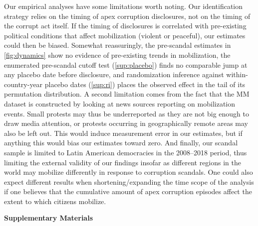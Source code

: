 \documentclass[11pt]{article}
\begin{document}
Our empirical analyses have some limitations worth noting. Our identification strategy relies on the timing of apex corruption disclosures, not on the timing of the corrupt act itself. If the timing of disclosures is correlated with pre-existing political conditions that affect mobilization (violent or peaceful), our estimates could then be biased. Somewhat reassuringly, the pre-scandal estimates in \autoref{fig:dynamics} show no evidence of pre-existing trends in mobilization, the enumerated pre-scandal cutoff test (\autoref{sup:placebo}) finds no comparable jump at any placebo date before disclosure, and randomization inference against within-country-year placebo dates (\autoref{sup:ri}) places the observed effect in the tail of its permutation distribution. A second limitation comes from the fact that the MM dataset is constructed by looking at news sources reporting on mobilization events. Small protests may thus be underreported as they are not big enough to draw media attention, or protests occurring in geographically remote areas may also be left out. This would induce measurement error in our estimates, but if anything this would bias our estimates toward zero. And finally, our scandal sample is limited to Latin American democracies in the 2008--2018 period, thus limiting the external validity of our findings insofar as different regions in the world may mobilize differently in response to corruption scandals. One could also expect different results when shortening/expanding the time scope of the analysis if one believes that the cumulative amount of apex corruption episodes affect the extent to which citizens mobilize.

\clearpage


\clearpage
\appendix
\renewcommand{\thesection}{S\arabic{section}}
\renewcommand{\thesubsection}{S\arabic{section}.\arabic{subsection}}
\renewcommand{\thetable}{S\arabic{table}}
\renewcommand{\thefigure}{S\arabic{figure}}
\setcounter{section}{0}
\setcounter{table}{0}
\setcounter{figure}{0}

\begin{center}
    {\Large\bfseries Supplementary Materials}
\end{center}
\bigskip
\end{document}
